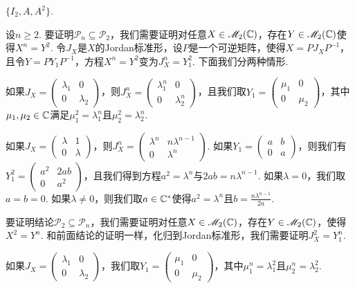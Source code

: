 \begin{solution}
  $\{I_2,A,A^2\}$.
\end{solution}

\begin{solution}
  设$n\ge2$. 要证明$\mathscr P_n\subseteq\mathscr P_2$，我们需要证明对任意$X\in\mathscr M_2(\mathbb C)$，存在$Y\in\mathscr M_2(\mathbb C)$使得$X^n=Y^2$. 令$J_X$是$X$的Jordan标准形，设$P$是一个可逆矩阵，使得$X=PJ_XP^{-1}$，且令$Y=PY_1P^{-1}$，方程$X^n=Y^2$变为$J_X^n=Y_1^2$. 下面我们分两种情形.

  如果$J_X=\begin{pmatrix}
    \lambda_1 & 0 \\
    0 & \lambda_2
  \end{pmatrix}$，则$J_X^n=\begin{pmatrix}
    \lambda_1^n & 0 \\
    0 & \lambda_2^n
  \end{pmatrix}$，且我们取$Y_1=\begin{pmatrix}
    \mu_1 & 0 \\
    0 & \mu_2
  \end{pmatrix}$，其中$\mu_1,\mu_2\in\mathbb C$满足$\mu_1^2=\lambda_1^n$且$\mu_2^2=\lambda_2^n$.

  如果$J_X=\begin{pmatrix}
    \lambda & 1 \\
    0 & \lambda
  \end{pmatrix}$，则$J_X^n=\begin{pmatrix}
    \lambda^n & n\lambda^{n-1} \\
    0 & \lambda^n
  \end{pmatrix}$. 如果$Y_1=\begin{pmatrix}
    a & b \\
    0 & a
  \end{pmatrix}$，则我们有$Y_1^2=\begin{pmatrix}
    a^2 & 2ab \\
    0 & a^2
  \end{pmatrix}$，且我们得到方程$a^2=\lambda^n$与$2ab=n\lambda^{n-1}$. 如果$\lambda=0$，我们取$a=b=0$. 如果$\lambda\ne0$，则我们取$a\in\mathbb C^\ast$使得$a^2=\lambda^n$且$b=\frac{n\lambda^{n-1}}{2a}$.

  要证明结论$\mathscr P_2\subseteq\mathscr P_n$，我们需要证明对任意$X\in\mathscr M_2(\mathbb C)$，存在$Y\in\mathscr M_2(\mathbb C)$，使得$X^2=Y^n$. 和前面结论的证明一样，化归到Jordan标准形，我们需要证明$J_X^2=Y_1^n$.

  如果$J_X=\begin{pmatrix}
    \lambda_1 & 0 \\
    0 & \lambda_2
  \end{pmatrix}$，我们取$Y_1=\begin{pmatrix}
    \mu_1 & 0 \\
    0 & \mu_2
  \end{pmatrix}$，其中$\mu_1^n=\lambda_1^2$且$\mu_2^n=\lambda_2^2$.


\end{solution}
